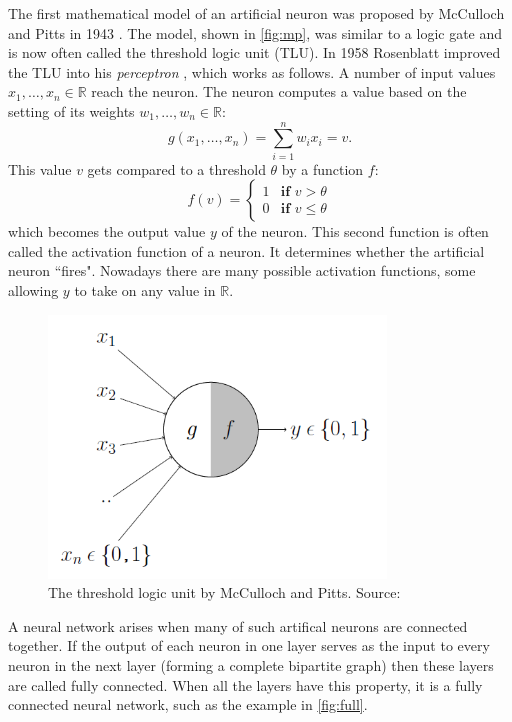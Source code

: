 \documentclass{article}
\begin{document}
The first mathematical model of an artificial neuron was proposed by McCulloch and Pitts in 1943 \cite{first, mcc}. The model, shown in \autoref{fig:mp}, was similar to a logic gate and is now often called the threshold logic unit (TLU). In 1958 Rosenblatt improved the TLU into his \textit{perceptron} \cite{percep}, which works as follows. A number of input values $x_1, \ldots, x_n \in \mathbb{R}$ reach the neuron. The neuron computes a value based on the setting of its weights $w_1, \ldots, w_n \in \mathbb{R}$:
\begin{equation*}
    g(x_1, \ldots, x_n) = \sum_{i=1}^n w_i x_i = v.
\end{equation*}
This value $v$ gets compared to a threshold $\theta$ by a function $f$:
\begin{equation}
    f(v) = 
    \begin{cases}
        1 & \textbf{if } v > \theta \\
        0 & \textbf{if } v \leq \theta
    \end{cases}
\end{equation}
which becomes the output value $y$ of the neuron. This second function is often called the activation function of a neuron. It determines whether the artificial neuron ``fires". Nowadays there are many possible activation functions, some allowing $y$ to take on any value in $\mathbb{R}$.\\

\begin{figure}
    \centering
    \includegraphics[width=0.8\textwidth]{images/mp.png}
    \caption{The threshold logic unit by McCulloch and Pitts. Source: \cite{med}}
    \label{fig:mp}
\end{figure}

A neural network arises when many of such artifical neurons are connected together. If the output of each neuron in one layer serves as the input to every neuron in the next layer (forming a complete bipartite graph) then these layers are called fully connected. When all the layers have this property, it is a fully connected neural network, such as the example in \autoref{fig:full}.\\
\end{document}
